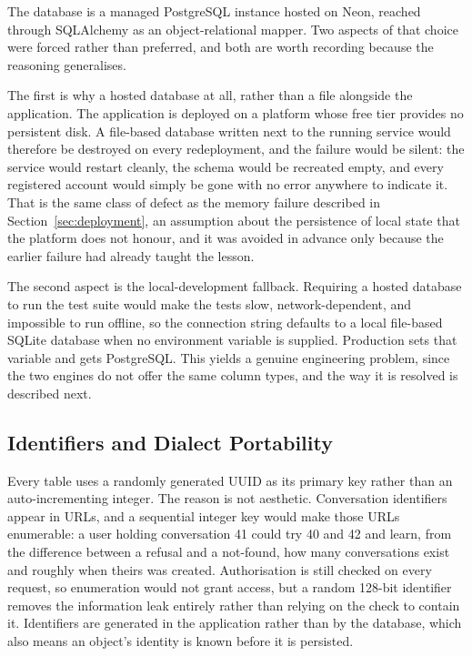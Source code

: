 The database is a managed PostgreSQL instance hosted on Neon, reached through SQLAlchemy as
an object-relational mapper. Two aspects of that choice were forced rather than preferred,
and both are worth recording because the reasoning generalises.

The first is why a hosted database at all, rather than a file alongside the application. The
application is deployed on a platform whose free tier provides no persistent disk. A
file-based database written next to the running service would therefore be destroyed on
every redeployment, and the failure would be silent: the service would restart cleanly, the
schema would be recreated empty, and every registered account would simply be gone with no
error anywhere to indicate it. That is the same class of defect as the memory failure
described in Section~\ref{sec:deployment}, an assumption about the persistence of local
state that the platform does not honour, and it was avoided in advance only because the
earlier failure had already taught the lesson.

The second aspect is the local-development fallback. Requiring a hosted database to run the
test suite would make the tests slow, network-dependent, and impossible to run offline, so
the connection string defaults to a local file-based SQLite database when no environment
variable is supplied. Production sets that variable and gets PostgreSQL. This yields a
genuine engineering problem, since the two engines do not offer the same column types, and
the way it is resolved is described next.

\subsection{Identifiers and Dialect Portability}

Every table uses a randomly generated UUID as its primary key rather than an
auto-incrementing integer. The reason is not aesthetic. Conversation identifiers appear in
URLs, and a sequential integer key would make those URLs enumerable: a user holding
conversation 41 could try 40 and 42 and learn, from the difference between a refusal and a
not-found, how many conversations exist and roughly when theirs was created. Authorisation
is still checked on every request, so enumeration would not grant access, but a random
128-bit identifier removes the information leak entirely rather than relying on the check to
contain it. Identifiers are generated in the application rather than by the database, which
also means an object's identity is known before it is persisted.


